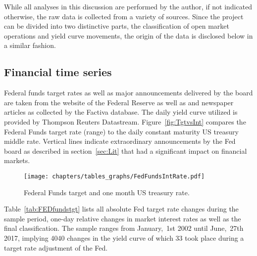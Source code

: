 
While all analyses in this discussion are performed by the author, if not indicated otherwise, the raw data is collected from a variety of sources. Since the project can be divided into two distinctive parts, the classification of open market operations and yield curve movements, the origin of the data is disclosed below in a similar fashion.

\subsection{Financial time series}
Federal funds target rates as well as major announcements delivered by the board are taken from the website of the Federal Reserve \cite{Fed.OMOs} as well as \textcite{Fawley.2013} and newspaper articles as collected by the Factiva database. The daily yield curve utilized is provided by Thompson Reuters Datastream. Figure~\vref{fig:TgtvsInt} compares the Federal Funds target rate (range) to the daily constant maturity US treasury middle rate. Vertical lines indicate extraordinary announcements by the Fed board as described in section~\ref{sec:Lit} that had a significant impact on financial markets.
\begin{figure}[htbp]
	\centering
		\texttt{[image: chapters/tables\_graphs/FedFundsIntRate.pdf]} 
	\caption{Federal Funds target and one month US treasury rate.}
\label{fig:TgtvsInt}
\end{figure}
%

Table~\vref{tab:FEDfundstgt} lists all absolute Fed target rate changes during the sample period, one-day relative changes in market interest rates as well as the final classification. The sample ranges from January,~1st 2002 until June,~27th 2017, implying 4040 changes in the yield curve of which 33 took place during a target rate adjustment of the Fed. 
%

%

